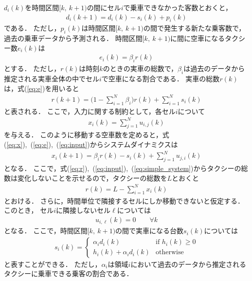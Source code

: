 \documentclass[a4j,9pt,twocolumn]{paper}
\begin{document}
\par
$d_i(k)$を時間区間$[k,\ k+1)$の間にセル$i$で乗車できなかった客数とおくと，
\begin{align}
 d_i(k+1) = d_i(k)-s_i(k)+p_i(k)
\end{align}
である．
ただし，$p_i(k)$は時間区間$[k,\ k+1)$の間で発生する新たな乗客数で，過去の乗車データから予測される．
時間区間$[k,\ k+1)$に間に空車になるタクシー数$e_i(k)$は
\begin{align}
 e_i(k)=\beta_{i}r(k) \label{eq:e}
\end{align}
とする．
ただし，$r(k)$は時刻$k$のときの実車の総数で，$\beta_{i}$は過去のデータから推定される実車全体の中でセル$i$で空車になる割合である．
実車の総数$r(k)$は，式(\ref{eq:e})を用いると
\begin{align}
 r(k+1) = \bigg(1-\sum_{i=1}^{N}\beta_i\bigg)r(k)+\sum_{i=1}^{N}s_i(k) \label{eq:r}
\end{align}
と表される．
ここで，入力に関する制約として，各セル$i$について
\begin{align}
 x_i(k)=\sum_{j=1}^{N}u_{i,j}(k) \label{eq:input}
\end{align}
を与える．
このように移動する空車数を定めると，式(\ref{eq:x}),\ (\ref{eq:e}),\ (\ref{eq:input})からシステムダイナミクスは
\begin{align}
 x_i(k+1)=\beta_i r(k)-s_i(k)+\sum_{j=1}^{N} u_{j,i}(k) \label{eq:simple_system}
\end{align}
となる．
ここで，式(\ref{eq:r}),\ (\ref{eq:input}),\ (\ref{eq:simple_system})からタクシーの総数は変化しないことを示せるので，タクシーの総数を$L$とおくと
\begin{align}
 r(k)= L-\sum_{i=1}^{N}x_i(k) \label{eq:r_new}
\end{align}
とおける．
さらに，時間単位で隣接するセルにしか移動できないと仮定する．このとき，
セル$i$に隣接しないセル$\ell$については
\begin{align}
 u_{i, \ell}(k)=0 \qquad  \forall k \label{eq:u_seiyaku}
\end{align}
となる．
ここで，時間区間$[k,\ k+1)$の間で実車になる台数$s_i(k)$については
\begin{align}
 s_i(k)=\left\{
\begin{array}{ll}
 \alpha_i d_i(k) & \mbox{if }h_i(k) \geq 0 \\
h_i(k)+\alpha_i d_i(k) & \mbox{otherwise}
\end{array}\right. \label{eq:s2}
\end{align}
と表すことができる．
ただし，$\alpha_i$は領域$i$において過去のデータから推定されるタクシーに乗車できる乗客の割合である．
\end{document}
